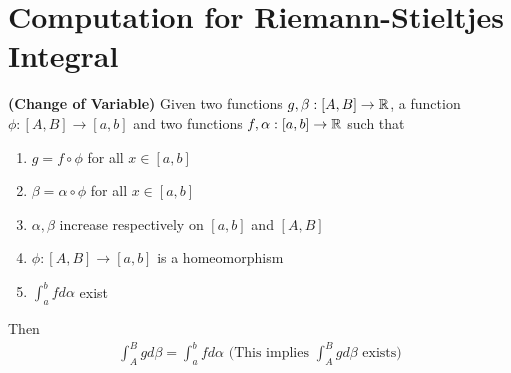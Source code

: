 \documentclass{report}
\begin{document}
\section{Computation for Riemann-Stieltjes Integral}
\begin{theorem}
\label{CoV}
\textbf{(Change of Variable)} Given two functions $g,\beta  :[A,B]\rightarrow \mathbb{R}$, a function $\phi: [A,B]\rightarrow [a,b]$ and two functions $f,\alpha :[a,b]\rightarrow \mathbb{R}$ such that 
\begin{enumerate}[label=(\alph*)]
  \item $g = f \circ  \phi $ for all $x \in [a,b]$
  \item $\beta = \alpha  \circ \phi $ for all $x \in [a,b]$ 
  \item $\alpha , \beta  $ increase respectively on $[a,b]$ and $[A,B]$ 
  \item $\phi:[A,B]\rightarrow [a,b]$ is a homeomorphism 
  \item $\int_a^b fd\alpha $ exist
\end{enumerate}
Then 
\begin{align*}
\int_A^B g d\beta  =\int_a^b fd\alpha \text{   (This implies $\int_A^B gd\beta $ exists)}
\end{align*}
\end{theorem}          
\end{document}
